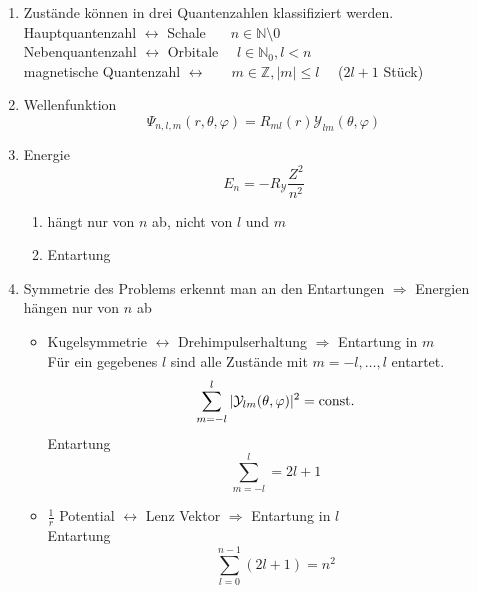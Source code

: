 \begin{enumerate}[1)]
	\item Zustände können in drei Quantenzahlen klassifiziert werden.\\[5pt]
	Hauptquantenzahl $ \leftrightarrow $ Schale $\quad \ \ n \in \mathbb{N} \setminus 0 $\\
	Nebenquantenzahl $ \leftrightarrow $ Orbitale $ \quad l \in \mathbb{N}_0 , l < n $\\
	magnetische Quantenzahl $ \leftrightarrow $ $ \quad \ \ m \in \mathbb{Z} , |m| \le l \quad $ ($ 2l + 1 $ Stück)
	\item Wellenfunktion
	\begin{equation*}
	\Psi_{n,l,m}(r,\theta,\varphi) = R_{ml}(r) \mathcal{Y}_{lm}(\theta,\varphi)
	\end{equation*}
	\item Energie
	\begin{equation*}
	E_n = - R_{\mathcal{Y}}\frac{Z^2}{n^2}
	\end{equation*}
	\begin{enumerate}[$ \Rightarrow $]
		\item hängt nur von $ n $ ab, nicht von $ l $ und $ m $
		\item Entartung
	\end{enumerate}
	\item Symmetrie des Problems erkennt man an den Entartungen
	$ \Rightarrow $ Energien hängen nur von $ n $ ab
	\begin{itemize}
		\item Kugelsymmetrie $ \leftrightarrow $ Drehimpulserhaltung $ \Rightarrow $ Entartung in $ m $\\[5pt]
		Für ein gegebenes $ l $ sind alle Zustände mit  $ m = -l, \dots, l $ entartet.
		\begin{equation*}
		\sum_{m=-l}^{l} |\mathcal{Y}_{lm}(\theta,\varphi)|^2 = \textrm{const.}
		\end{equation*}
		Entartung
		\begin{equation*}
		\sum_{m=-l}^{l} = 2l + 1
		\end{equation*}
		\item $ \frac{1}{r} $ Potential $ \leftrightarrow $ Lenz Vektor $ \Rightarrow $ Entartung in $ l $\\[5pt]
		Entartung
		$$ \sum_{l=0}^{n-1} (2l+1) = n^2 $$
	\end{itemize}
	\\
\end{enumerate}

